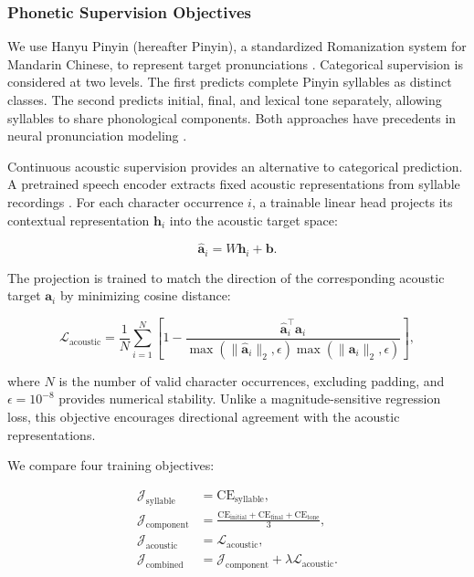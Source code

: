 \subsubsection{Phonetic Supervision Objectives}
\label{sec:intro-supervision}

We use Hanyu Pinyin (hereafter Pinyin), a standardized Romanization system for
Mandarin Chinese, to represent target pronunciations \cite{ref_pinyin}.
Categorical supervision is considered at two levels. The first predicts complete
Pinyin syllables as distinct classes. The second predicts initial, final, and
lexical tone separately, allowing syllables to share phonological components.
Both approaches have precedents in neural pronunciation modeling
\cite{ref_g2pm2020,ref_li_scope2022}.

Continuous acoustic supervision provides an alternative to categorical
prediction. A pretrained speech encoder extracts fixed acoustic representations
from syllable recordings \cite{ref_wav2vec2,ref_xlsr2021}. For each character
occurrence $i$, a trainable linear head projects its contextual representation
$\mathbf{h}_i$ into the acoustic target space:

\begin{equation}
\label{eq:acoustic-projection}
    \hat{\mathbf{a}}_i = W\mathbf{h}_i + \mathbf{b}.
\end{equation}

The projection is trained to match the direction of the corresponding acoustic
target $\mathbf{a}_i$ by minimizing cosine distance:

\begin{equation}
\label{eq:acoustic-loss}
    \mathcal{L}_{\mathrm{acoustic}}
    =
    \frac{1}{N}\sum_{i=1}^{N}
    \left[
    1 -
    \frac{
        \hat{\mathbf{a}}_i^\top \mathbf{a}_i
    }{
        \max(\|\hat{\mathbf{a}}_i\|_2,\epsilon)
        \max(\|\mathbf{a}_i\|_2,\epsilon)
    }
    \right],
\end{equation}

where $N$ is the number of valid character occurrences, excluding padding, and
$\epsilon=10^{-8}$ provides numerical stability. Unlike a magnitude-sensitive
regression loss, this objective encourages directional agreement with the
acoustic representations.

We compare four training objectives:

\begin{equation}
\label{eq:training-objectives}
\begin{aligned}
\mathcal{J}_{\mathrm{syllable}}
    &= \mathrm{CE}_{\mathrm{syllable}}, \\[3pt]
\mathcal{J}_{\mathrm{component}}
    &= \frac{
        \mathrm{CE}_{\mathrm{initial}}
        + \mathrm{CE}_{\mathrm{final}}
        + \mathrm{CE}_{\mathrm{tone}}
    }{3}, \\[3pt]
\mathcal{J}_{\mathrm{acoustic}}
    &= \mathcal{L}_{\mathrm{acoustic}}, \\[3pt]
\mathcal{J}_{\mathrm{combined}}
    &= \mathcal{J}_{\mathrm{component}}
       + \lambda\mathcal{L}_{\mathrm{acoustic}}.
\end{aligned}
\end{equation}

